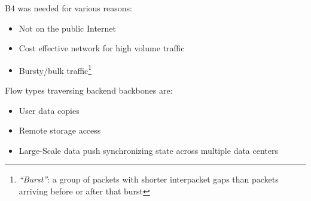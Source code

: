 B4 was needed for various reasons:
\begin{itemize}
   \item Not on the public Internet
   \item Cost effective network for high volume traffic
   \item Bursty/bulk traffic\footnote{\textit{``Burst''}: a group of packets with shorter interpacket gaps than packets arriving before or after that burst}
\end{itemize}

Flow types traversing backend backbones are:
\begin{itemize}
   \item User data copies
   \item Remote storage access
   \item Large-Scale data push synchronizing state across multiple data centers
\end{itemize}